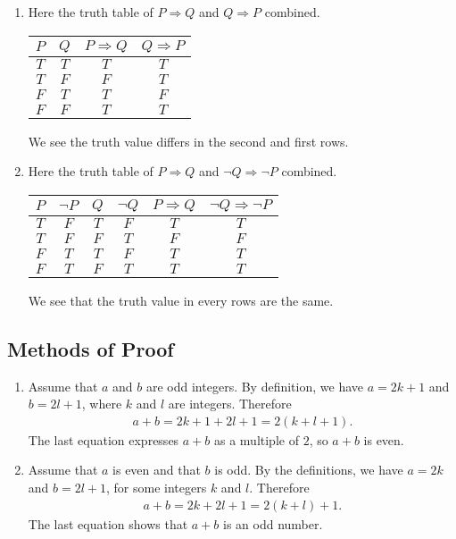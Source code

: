  \begin{problem}
 	\begin{enumerate}[label=\alph*)]
 		\item Here the truth table of $P \Rightarrow Q$ and $Q \Rightarrow P$ combined. 
 		\begin{center}
 		\begin{tabular}{c|c|c|c}
 		$P$ & $Q$ & $P \Rightarrow Q$ & $Q \Rightarrow P$ \\\hline 
 		$T$ & $T$ & $T$ & $T$ \\\hline 
 		$T$ & $F$ & $F$ & $T$  \\\hline 
 		$F$ & $T$ & $T$ & $F$ \\\hline 
 		$F$ & $F$ & $T$ & $T$ \\
 		\end{tabular}
 		\end{center}
 		We see the truth value differs in the second and first rows.
 		\item Here the truth table of $P \Rightarrow Q$ and $\neg Q \Rightarrow \neg P$ combined. 
 		\begin{center}
 		\begin{tabular}{c|c|c|c|c|c}
 		$P$ & $\neg P$ & $Q$ & $\neg Q$ & $P \Rightarrow Q$ & $\neg Q \Rightarrow \neg P$ \\\hline
 		$T$ & $F$ & $T$ & $F$ & $T$ & $T$ \\\hline 
 		$T$ & $F$ & $F$ & $T$ & $F$ & $F$  \\\hline 
 		$F$ & $T$ & $T$ & $F$ & $T$ & $T$ \\\hline 
 		$F$ & $T$ & $F$ & $T$ & $T$ & $T$ \\
 		\end{tabular}
 		\end{center}
 		We see that the truth value in every rows are the same.
 	\end{enumerate}
 \end{problem}

 \subsection[~~Methods of Proof]{Methods of Proof}

 \begin{problem}
 	\begin{enumerate}[label=\alph*)]
 		\item Assume that $a$ and $b$ are odd integers. By definition, we have $a = 2k + 1$ and $b = 2l + 1$, where $k$ and $l$ are integers. Therefore
 			\begin{align*}
 			a + b = 2k + 1 + 2l + 1 = 2 (k + l + 1) .
 			\end{align*}
 		The last equation expresses $a + b$ as a multiple of $2$, so $a + b$ is even.
 		\item Assume that $a$ is even and that $b$ is odd. By the definitions, we have $a = 2k$ and $b = 2l + 1$, for some integers $k$ and $l$. Therefore
 			\begin{align*}
 			a + b = 2k + 2l + 1 = 2 (k + l) + 1 .
 			\end{align*}
 		The last equation shows that $a + b$ is an odd number.
 	\end{enumerate}
 \end{problem}

